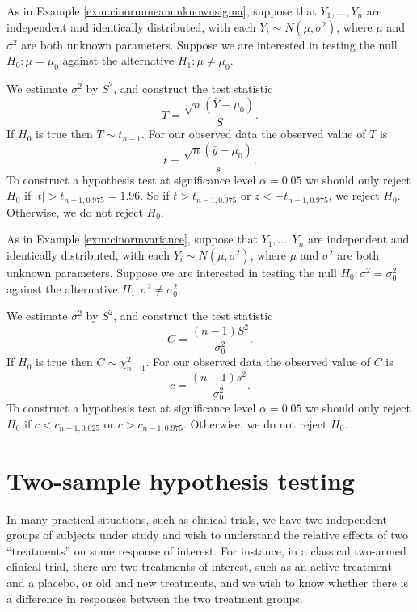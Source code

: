 \documentclass[]{book}
\theoremstyle{definition}
\theoremstyle{definition}
\theoremstyle{definition}
\theoremstyle{remark}
\let\BeginKnitrBlock\begin \let\EndKnitrBlock\end
\begin{document}
\BeginKnitrBlock{example}[Normal mean, unknown variance]
\protect\hypertarget{exm:unnamed-chunk-107}{}{\label{exm:unnamed-chunk-107}
\iffalse (Normal mean, unknown variance) \fi{} }As in Example
\ref{exm:cinormmeanunknownsigma}, suppose that \(Y_1, \ldots, Y_n\) are
independent and identically distributed, with each
\(Y_i \sim N(\mu, \sigma^2)\), where \(\mu\) and \(\sigma^2\) are both
unknown parameters. Suppose we are interested in testing the null
\(H_0: \mu = \mu_0\) against the alternative \(H_1: \mu \not = \mu_0\).

We estimate \(\sigma^2\) by \(S^2\), and construct the test statistic
\[T = \frac{\sqrt{n}(\bar Y - \mu_0)}{S}.\] If \(H_0\) is true then
\(T \sim t_{n-1}\). For our observed data the observed value of \(T\) is
\[t =  \frac{\sqrt{n}(\bar y - \mu_0)}{s}.\] To construct a hypothesis
test at significance level \(\alpha = 0.05\) we should only reject
\(H_0\) if \(|t| > t_{n-1, 0.975} = 1.96\). So if \(t > t_{n-1, 0.975}\)
or \(z < -t_{n-1, 0.975}\), we reject \(H_0\). Otherwise, we do not
reject \(H_0\).
\EndKnitrBlock{example}

\BeginKnitrBlock{example}[Normal variance]
\protect\hypertarget{exm:unnamed-chunk-108}{}{\label{exm:unnamed-chunk-108}
\iffalse (Normal variance) \fi{} }As in Example
\ref{exm:cinormvariance}, suppose that \(Y_1, \ldots, Y_n\) are
independent and identically distributed, with each
\(Y_i \sim N(\mu, \sigma^2)\), where \(\mu\) and \(\sigma^2\) are both
unknown parameters. Suppose we are interested in testing the null
\(H_0: \sigma^2 = \sigma^2_0\) against the alternative
\(H_1: \sigma^2 \not = \sigma^2_0\).

We estimate \(\sigma^2\) by \(S^2\), and construct the test statistic
\[C = \frac{(n-1) S^2}{\sigma_0^2}.\] If \(H_0\) is true then
\(C \sim \chi^2_{n-1}\). For our observed data the observed value of
\(C\) is \[c =  \frac{(n-1) s^2}{\sigma_0^2}.\] To construct a
hypothesis test at significance level \(\alpha = 0.05\) we should only
reject \(H_0\) if \(c < c_{n-1, 0.025}\) or \(c > c_{n-1, 0.975}\).
Otherwise, we do not reject \(H_0\).
\EndKnitrBlock{example}

\section{Two-sample hypothesis
testing}\label{two-sample-hypothesis-testing}

In many practical situations, such as clinical trials, we have two
independent groups of subjects under study and wish to understand the
relative effects of two ``treatments'' on some response of interest. For
instance, in a classical two-armed clinical trial, there are two
treatments of interest, such as an active treatment and a placebo, or
old and new treatments, and we wish to know whether there is a
difference in responses between the two treatment groups.
\end{document}

